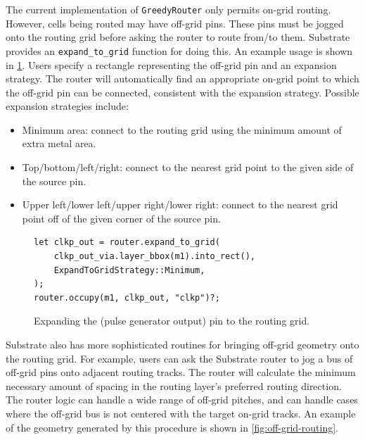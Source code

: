 The current implementation of \verb|GreedyRouter| only permits on-grid routing.
However, cells being routed may have off-grid pins. These pins must be jogged onto
the routing grid before asking the router to route from/to them. Substrate
provides an \verb|expand_to_grid| function for doing this. An example usage is shown in \ref{fig:router-expand-to-grid}.
Users specify a rectangle representing the off-grid pin and an expansion strategy. The router
will automatically find an appropriate on-grid point to which the off-grid pin can be connected,
consistent with the expansion strategy. Possible expansion strategies include:
\begin{itemize}
\item Minimum area: connect to the routing grid using the minimum amount of extra metal area.
\item Top/bottom/left/right: connect to the nearest grid point to the given side of the source pin.
\item Upper left/lower left/upper right/lower right: connect to the nearest grid point off of the given corner of the source pin.
\end{itemize}

\begin{figure}[H] \centering
\begin{verbatim}
let clkp_out = router.expand_to_grid(
    clkp_out_via.layer_bbox(m1).into_rect(),
    ExpandToGridStrategy::Minimum,
);
router.occupy(m1, clkp_out, "clkp")?;
\end{verbatim}
\caption{Expanding the (pulse generator output) pin to the routing grid. \label{fig:router-expand-to-grid}}
\end{figure}


Substrate also has more sophisticated routines for bringing off-grid geometry onto the routing grid.
For example, users can ask the Substrate router to jog a bus of off-grid pins onto adjacent routing tracks.
The router will calculate the minimum necessary amount of spacing in the routing layer's preferred routing direction.
The router logic can handle a wide range of off-grid pitches, and can handle cases where the off-grid bus is not centered
with the target on-grid tracks. An example of the geometry generated by this procedure is shown in \ref{fig:off-grid-routing}.

